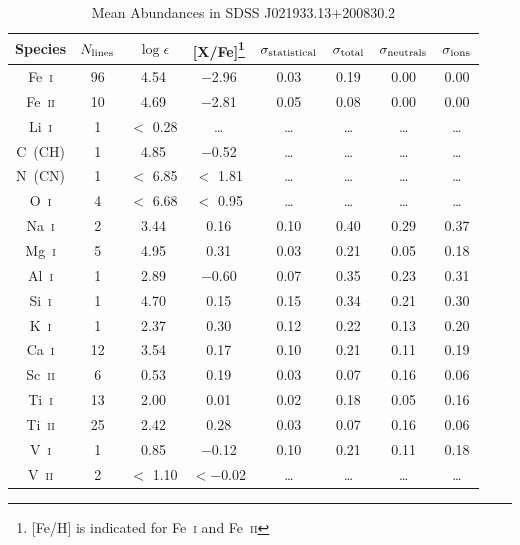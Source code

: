 \documentclass[useAMS,usenatbib,usegraphicx]{mn2e}
\begin{document}
\begin{table}
\begin{minipage}{\textwidth}
\caption{Mean Abundances in SDSS J021933.13$+$200830.2
\label{abundtab}}
\begin{tabular}{cccccccc}
\hline
Species &
$N_{\rm lines}$ &
$\log\epsilon$ &
[X/Fe]\footnote{[Fe/H] is indicated for Fe~\textsc{i} and Fe~\textsc{ii}} &
$\sigma_{\rm statistical}$ &
$\sigma_{\rm total}$ &
$\sigma_{\rm neutrals}$ &
$\sigma_{\rm ions}$ \\
\hline
 Fe~\textsc{i}  &  96 &     4.54 & $-$2.96 &  0.03 &  0.19 &  0.00 &  0.00  \\
 Fe~\textsc{ii} &  10 &     4.69 & $-$2.81 &  0.05 &  0.08 &  0.00 &  0.00  \\
 Li~\textsc{i}  &   1 & $<$ 0.28 & \ldots  & \ldots& \ldots& \ldots& \ldots \\
 C~(CH)         &   1 &     4.85 & $-$0.52 & \ldots& \ldots& \ldots& \ldots \\
 N~(CN)         &   1 & $<$ 6.85 &$<$ 1.81 & \ldots& \ldots& \ldots& \ldots \\
 O~\textsc{i}   &   4 & $<$ 6.68 &$<$ 0.95 & \ldots& \ldots& \ldots& \ldots \\
 Na~\textsc{i}  &   2 &     3.44 &    0.16 &  0.10 &  0.40 &  0.29 &  0.37  \\
 Mg~\textsc{i}  &   5 &     4.95 &    0.31 &  0.03 &  0.21 &  0.05 &  0.18  \\
 Al~\textsc{i}  &   1 &     2.89 & $-$0.60 &  0.07 &  0.35 &  0.23 &  0.31  \\
 Si~\textsc{i}  &   1 &     4.70 &    0.15 &  0.15 &  0.34 &  0.21 &  0.30  \\
 K~\textsc{i}   &   1 &     2.37 &    0.30 &  0.12 &  0.22 &  0.13 &  0.20  \\
 Ca~\textsc{i}  &  12 &     3.54 &    0.17 &  0.10 &  0.21 &  0.11 &  0.19  \\
 Sc~\textsc{ii} &   6 &     0.53 &    0.19 &  0.03 &  0.07 &  0.16 &  0.06  \\
 Ti~\textsc{i}  &  13 &     2.00 &    0.01 &  0.02 &  0.18 &  0.05 &  0.16  \\
 Ti~\textsc{ii} &  25 &     2.42 &    0.28 &  0.03 &  0.07 &  0.16 &  0.06  \\
 V~\textsc{i}   &   1 &     0.85 & $-$0.12 &  0.10 &  0.21 &  0.11 &  0.18  \\
 V~\textsc{ii}  &   2 & $<$ 1.10 &$<-$0.02 & \ldots& \ldots& \ldots& \ldots \\

\end{tabular}
\end{minipage}
\end{table}
\end{document}
